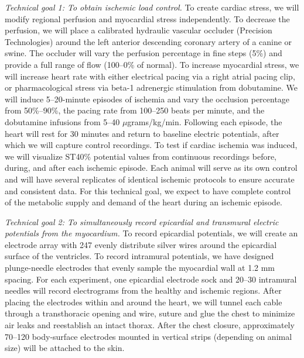  \textit{Technical goal 1: To obtain ischemic load
  control.} To create cardiac stress, we will modify regional perfusion and
myocardial stress independently. To decrease the perfusion, we will place a
calibrated hydraulic vascular occluder (Precision Technologies) around the
left anterior descending coronary artery of a canine or swine. The occluder will vary the
perfusion percentage in fine steps (5\%) and provide a full range of flow
(100--0\% of normal). To increase myocardial stress, we will increase heart
rate with either electrical pacing via a right atrial pacing clip, or
pharmacological stress via beta-1 adrenergic stimulation from
dobutamine. We will induce 5--20-minute episodes of ischemia and vary the
occlusion percentage from 50\%--90\%, the pacing rate from 100--250 beats
per minute, and the dobutamine infusions from 5--40
$\mu$grams/kg/min.\cite{BLZ:Man1988} Following each episode, the heart will
rest for 30 minutes and return to baseline electric potentials, after which
we will capture control recordings. To test if cardiac ischemia was
induced, we will visualize ST40\% potential values from continuous
recordings before, during, and after each ischemic episode. Each animal
will serve as its own control and will have several replicates of identical
ischemic protocols to ensure accurate and consistent data. For this technical goal, we expect to have complete control of the metabolic supply and demand of the heart during an ischemic episode.

\textit{Technical goal 2: To simultaneously record epicardial and
  transmural electric potentials from the myocardium.} To record epicardial
potentials, we will create an electrode array with 247 evenly distribute
silver wires around the epicardial surface of the ventricles. To record
intramural potentials, we have designed plunge-needle electrodes that
evenly sample the myocardial wall at 1.2 mm spacing. For each
experiment, one epicardial electrode sock and 20--30 intramural needles
will record electrograms from the healthy and ischemic regions. After
placing the electrodes within and around the heart, we will tunnel each
cable through a transthoracic opening and wire, suture and glue the chest to
minimize air leaks and reestablish an intact thorax. After the chest
closure, approximately 70--120 body-surface electrodes mounted in vertical
strips (depending on animal size) will be attached to the skin.

